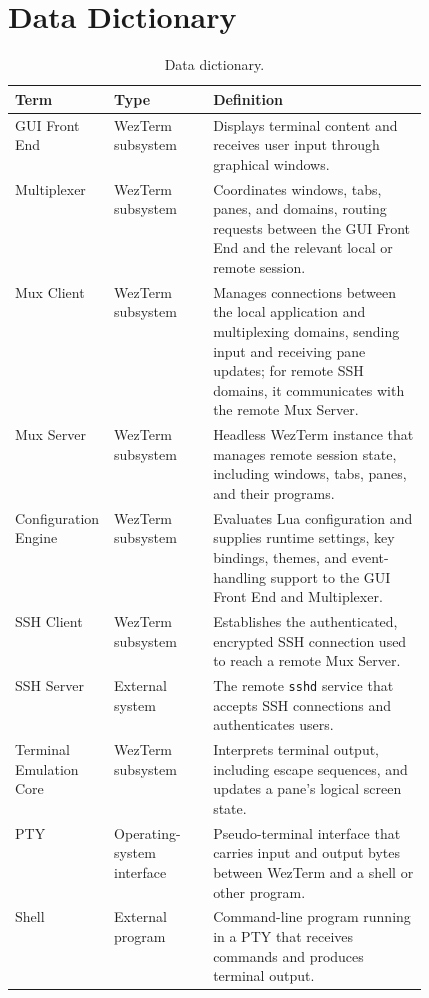 \section{Data Dictionary}
\label{sec:data-dictionary}

\begin{table}[H]
  \centering
  \caption{Data dictionary.}
  \label{tab:data-dictionary}
  \small
  \begin{tabularx}{\linewidth}{@{}>{\raggedright\arraybackslash}p{0.24\linewidth}>{\raggedright\arraybackslash}p{0.24\linewidth}X@{}}
    \toprule
    \textbf{Term} & \textbf{Type} & \textbf{Definition} \\
    \midrule
    GUI Front End & WezTerm subsystem & Displays terminal content and receives user input through graphical windows. \\
    Multiplexer & WezTerm subsystem & Coordinates windows, tabs, panes, and domains, routing requests between the GUI Front End and the relevant local or remote session. \\
    Mux Client & WezTerm subsystem & Manages connections between the local application and multiplexing domains, sending input and receiving pane updates; for remote SSH domains, it communicates with the remote Mux Server. \\
    Mux Server & WezTerm subsystem & Headless WezTerm instance that manages remote session state, including windows, tabs, panes, and their programs. \\
    Configuration Engine & WezTerm subsystem & Evaluates Lua configuration and supplies runtime settings, key bindings, themes, and event-handling support to the GUI Front End and Multiplexer. \\
    SSH Client & WezTerm subsystem & Establishes the authenticated, encrypted SSH connection used to reach a remote Mux Server. \\
    SSH Server & External system & The remote \texttt{sshd} service that accepts SSH connections and authenticates users. \\
    Terminal Emulation Core & WezTerm subsystem & Interprets terminal output, including escape sequences, and updates a pane's logical screen state. \\
    PTY & Operating-system interface & Pseudo-terminal interface that carries input and output bytes between WezTerm and a shell or other program. \\
    Shell & External program & Command-line program running in a PTY that receives commands and produces terminal output. \\

\end{tabularx}
\end{table}
